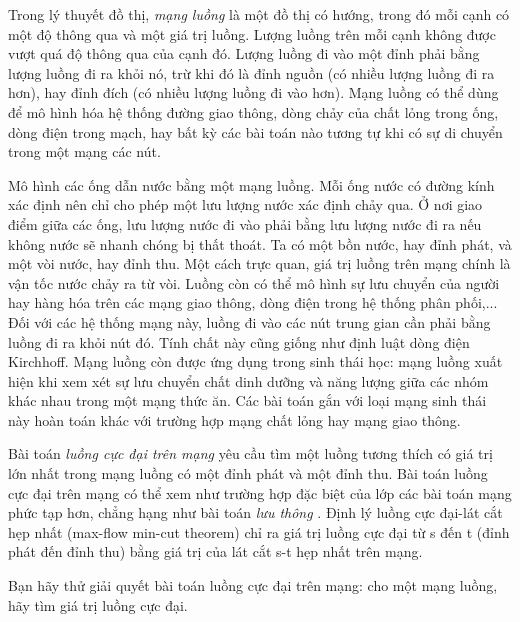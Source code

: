 Trong lý thuyết đồ thị,   \emph{    mạng luồng   }   là một đồ thị có hướng, trong đó mỗi cạnh có một độ thông qua và một giá trị luồng. Lượng luồng trên mỗi cạnh không được vượt quá độ thông qua của cạnh đó.   Lượng luồng đi vào một đỉnh phải bằng lượng luồng đi ra khỏi nó, trừ khi đó là đỉnh nguồn (có nhiều lượng luồng đi ra hơn), hay đỉnh đích (có nhiều lượng luồng đi vào hơn). Mạng luồng có thể dùng để mô   hình hóa hệ thống đường giao thông, dòng chảy của chất lỏng trong ống, dòng điện trong mạch, hay bất kỳ các bài toán nào tương tự khi có sự di chuyển trong một mạng các nút.  

   Mô hình các ống dẫn nước bằng một mạng luồng. Mỗi ống nước có đường kính xác định nên chỉ cho phép một lưu lượng nước xác định chảy qua. Ở nơi giao điểm giữa các ống, lưu lượng nước đi vào   phải bằng lưu lượng nước đi ra nếu không nước sẽ nhanh chóng bị thất thoát. Ta có một bồn nước, hay đỉnh phát, và một vòi nước, hay đỉnh thu. Một cách trực quan, giá trị luồng trên mạng chính là vận tốc   nước chảy ra từ vòi. Luồng còn có thể mô hình sự lưu chuyển của người hay hàng hóa trên các mạng giao thông, dòng điện trong hệ thống phân phối,... Đối với các hệ thống mạng này, luồng đi vào các nút   trung gian cần phải bằng luồng đi ra khỏi nút đó. Tính chất này cũng giống như định luật dòng điện Kirchhoff. Mạng luồng còn được ứng dụng trong sinh thái học: mạng luồng xuất hiện khi xem xét sự lưu   chuyển chất dinh dưỡng và năng lượng giữa các nhóm khác nhau trong một mạng thức ăn. Các bài toán gắn với loại mạng sinh thái này hoàn toán khác với trường hợp mạng chất lỏng hay mạng giao thông.  

   Bài toán   \emph{    luồng cực đại trên mạng   }   yêu cầu tìm một luồng tương thích có giá trị lớn nhất trong mạng luồng có một đỉnh phát và một đỉnh thu. Bài toán luồng cực đại trên mạng có thể xem như trường   hợp đặc biệt của lớp các bài toán mạng phức tạp hơn, chẳng hạng như bài toán   \emph{    lưu thông   }   . Định lý luồng cực đại-lát cắt hẹp nhất (max-flow min-cut theorem) chỉ ra giá trị luồng cực đại từ s đến t (đỉnh   phát đến đỉnh thu) bằng giá trị của lát cắt s-t hẹp nhất trên mạng.  

   Bạn hãy thử giải quyết bài toán luồng cực đại trên mạng: cho một mạng luồng, hãy tìm giá trị luồng cực đại.